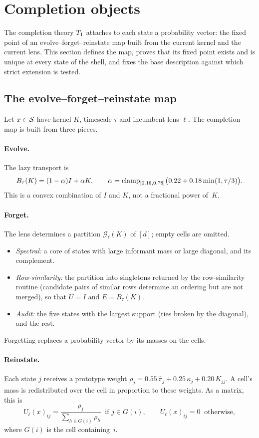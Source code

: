 \section{Completion objects}\label{sec:completion}

The completion theory $T_1$ attaches to each state a probability vector: the fixed point of an evolve--forget--reinstate map built from the current kernel and the current lens. This section defines the map, proves that its fixed point exists and is unique at every state of the shell, and fixes the base description against which strict extension is tested.

\subsection{The evolve--forget--reinstate map}

Let $x\in\mathcal{S}$ have kernel $K$, timescale $\tau$ and incumbent lens $\ell$. The completion map is built from three pieces.

\paragraph{Evolve.}
The lazy transport is
\[
B_\tau(K)=(1-\alpha)I+\alpha K,\qquad \alpha=\operatorname{clamp}_{[0.18,0.78]}\bigl(0.22+0.18\min(1,\tau/3)\bigr).
\]
This is a convex combination of $I$ and $K$, not a fractional power of~$K$.

\paragraph{Forget.}
The lens determines a partition $\mathcal{G}_\ell(K)$ of $[d]$; empty cells are omitted.
\begin{itemize}
  \item \emph{Spectral:} a core of states with large informant mass or large diagonal, and its complement.
  \item \emph{Row-similarity:} the partition into singletons returned by the row-similarity routine (candidate pairs of similar rows determine an ordering but are not merged), so that $U=I$ and $E=B_\tau(K)$.
  \item \emph{Audit:} the five states with the largest support (ties broken by the diagonal), and the rest.
\end{itemize}
Forgetting replaces a probability vector by its masses on the cells.

\paragraph{Reinstate.}
Each state $j$ receives a prototype weight $\rho_j=0.55\,\hat\pi_j+0.25\,\kappa_j+0.20\,K_{jj}$. A cell's mass is redistributed over the cell in proportion to these weights. As a matrix, this is
\[
U_\ell(x)_{ij}=\frac{\rho_j}{\sum_{h\in G(i)}\rho_h}\ \text{ if } j\in G(i),\qquad U_\ell(x)_{ij}=0\ \text{ otherwise},
\]
where $G(i)$ is the cell containing~$i$.


